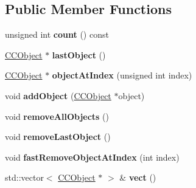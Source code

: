 \subsection*{Public Member Functions}
\begin{DoxyCompactItemize}
\item 
\hypertarget{class_g_a_f_1_1_c_c_array_a7fee3c1bfabcfcf7fa3f80511e9f2d3e}{unsigned int {\bfseries count} () const }\label{class_g_a_f_1_1_c_c_array_a7fee3c1bfabcfcf7fa3f80511e9f2d3e}

\item 
\hypertarget{class_g_a_f_1_1_c_c_array_ace44f70634187ea60d918c7d3a7ef971}{\hyperlink{class_g_a_f_1_1_c_c_object}{C\-C\-Object} $\ast$ {\bfseries last\-Object} ()}\label{class_g_a_f_1_1_c_c_array_ace44f70634187ea60d918c7d3a7ef971}

\item 
\hypertarget{class_g_a_f_1_1_c_c_array_a8ae859d22700439b031242fbe22c982d}{\hyperlink{class_g_a_f_1_1_c_c_object}{C\-C\-Object} $\ast$ {\bfseries object\-At\-Index} (unsigned int index)}\label{class_g_a_f_1_1_c_c_array_a8ae859d22700439b031242fbe22c982d}

\item 
\hypertarget{class_g_a_f_1_1_c_c_array_aa60d1a846fb8110a5f0720a6108d8de1}{void {\bfseries add\-Object} (\hyperlink{class_g_a_f_1_1_c_c_object}{C\-C\-Object} $\ast$object)}\label{class_g_a_f_1_1_c_c_array_aa60d1a846fb8110a5f0720a6108d8de1}

\item 
\hypertarget{class_g_a_f_1_1_c_c_array_a8131e3de0c1763c280a5446fce6432ab}{void {\bfseries remove\-All\-Objects} ()}\label{class_g_a_f_1_1_c_c_array_a8131e3de0c1763c280a5446fce6432ab}

\item 
\hypertarget{class_g_a_f_1_1_c_c_array_a6d4e35202989cf876fe8683652bc6352}{void {\bfseries remove\-Last\-Object} ()}\label{class_g_a_f_1_1_c_c_array_a6d4e35202989cf876fe8683652bc6352}

\item 
\hypertarget{class_g_a_f_1_1_c_c_array_a158b2114ddb9988588195bf9515cad7b}{void {\bfseries fast\-Remove\-Object\-At\-Index} (int index)}\label{class_g_a_f_1_1_c_c_array_a158b2114ddb9988588195bf9515cad7b}

\item 
\hypertarget{class_g_a_f_1_1_c_c_array_ae3c8354f2d5420781817303f0b61d097}{std\-::vector$<$ \hyperlink{class_g_a_f_1_1_c_c_object}{C\-C\-Object} $\ast$ $>$ \& {\bfseries vect} ()}\label{class_g_a_f_1_1_c_c_array_ae3c8354f2d5420781817303f0b61d097}

\end{DoxyCompactItemize}
